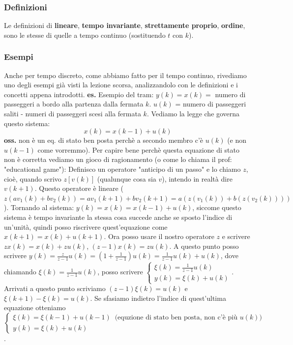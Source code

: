 \subsubsection{Definizioni}
Le definizioni di \textbf{lineare}, \textbf{tempo invariante}, \textbf{strettamente proprio}, \textbf{ordine}, sono le stesse di quelle a tempo continuo (sostituendo $t$ con $k$).
\subsubsection{Esempi}
Anche per tempo discreto, come abbiamo fatto per il tempo continuo, rivediamo uno degli esempi già visti la lezione scorsa, analizzandolo con le definizioni e i concetti appena introdotti.\newline
\newline
\textbf{es.} Esempio del tram:\newline
$y(k) = x(k) =$ numero di passeggeri a bordo alla partenza dalla fermata $k$.\newline
$u(k)$ = numero di passeggeri saliti - numeri di passeggeri scesi alla fermata $k$.\newline
Vediamo la legge che governa questo sistema:
\[
        x(k) = x(k-1) + u(k)
\]
\textbf{oss.} non è un eq. di stato ben posta perchè a secondo membro c'è $u(k)$ (e non $u(k-1)$ come vorremmo).\newline
\newline
Per capire bene perchè questa equazione di stato non è corretta vediamo un gioco di ragionamento (o come lo chiama il prof: "educational game"):\newline
Definisco un operatore "anticipo di un passo" e lo chiamo $z$, cioè, quando scrivo $z[v(k)]$ (qualunque cosa sia $v$), intendo in realtà dire $v(k+1)$. Questo operatore è lineare ( $z (a v_1(k) + b v_2(k)) = a v_1(k+1) + b v_2(k+1) = a (z(v_1(k)) + b (z(v_2(k))))$ ).\newline
Tornando al sistema: $y(k) = x(k) = x(k-1) + u(k)$, siccome questo sistema è tempo invariante la stessa cosa succede anche se sposto l'indice di un'unità, quindi posso riscrivere quest'equazione come $x(k+1) = x(k) + u (k+1)$. Ora posso usare il nostro operatore $z$ e scrivere $zx(k) = x(k) + zu(k)$, $(z-1) x(k) = z u(k)$.\newline
A questo punto posso scrivere $y(k) = \frac{z}{z-1}u(k) = (1+ \frac{1}{z-1})u(k) = \frac{1}{z-1}u(k) + u(k)$, dove chiamando $\xi(k) = \frac{1}{z-1}u(k)$, posso scrivere $\begin{cases}
    \xi(k) = \frac{1}{z-1}u(k)\\
    y(k) = \xi(k) + u(k)
\end{cases}$. Arrivati a questo punto scriviamo $(z-1) \xi (k) = u(k)$ e $\xi(k+1) - \xi(k) = u(k)$. Se sfasiamo indietro l'indice di quest'ultima equazione otteniamo $\begin{cases}
    \xi (k) = \xi(k-1) + u(k-1) \;\; \text{(equzione di stato ben posta, non c'è più $u(k)$)}\;\\
    y(k) = \xi(k) + u(k)
\end{cases}$.\newline
